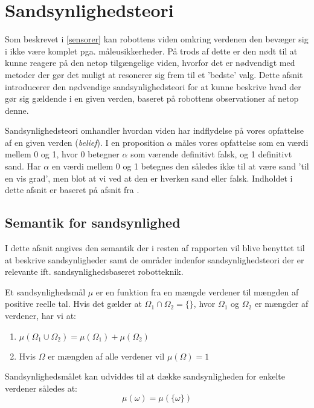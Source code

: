 

\section{Sandsynlighedsteori}
Som beskrevet i \cref{sensorer} kan robottens viden omkring verdenen den bevæger sig i ikke være komplet pga. måleusikkerheder.
På trods af dette er den nødt til at kunne reagere på den netop tilgængelige viden, hvorfor det er nødvendigt med metoder der gør det muligt at resonerer sig frem til et 'bedste' valg.
Dette afsnit introducerer den nødvendige sandsynlighedsteori for at kunne beskrive hvad der gør sig gældende i en given verden, baseret på robottens observationer af netop denne.

Sandsynlighedsteori omhandler hvordan viden har indflydelse på vores opfattelse af en given verden (\textit{belief}).
I en proposition $\alpha$ måles vores opfattelse som en værdi mellem 0 og 1, hvor 0 betegner $\alpha$ som værende definitivt falsk, og 1 definitivt sand.
Har $\alpha$ en værdi mellem 0 og 1 betegnes den således ikke til at være sand 'til en vis grad', men blot at vi ved at den er hverken sand eller falsk.
Indholdet i dette afsnit er baseret på afsnit fra \cite{ArtificialIntelligence}.

\subsection{Semantik for sandsynlighed}
I dette afsnit angives den semantik der i resten af rapporten vil blive benyttet til at beskrive sandsynligheder 
samt de områder indenfor sandsynlighedsteori der er relevante ift. sandsynlighedsbaseret robotteknik.

Et sandsynlighedsmål $\mu$ er en funktion fra en mængde verdener til mængden af positive reelle tal. 
Hvis det gælder at $\Omega_1 \cap \Omega_2 = \{{}\}$, hvor $\Omega_1$ og $\Omega_2$ er mængder af verdener, har vi at:

\begin{enumerate}
\item $\mu(\Omega_1 \cup \Omega_2) = \mu(\Omega_1) + \mu(\Omega_2)$
\item Hvis $\Omega$ er mængden af alle verdener vil $\mu(\Omega) = 1$ 
\end{enumerate}

Sandsynlighedsmålet kan udviddes til at dække sandsynligheden for enkelte verdener således at:
$$\mu(\omega) = \mu(\{\omega\})$$

